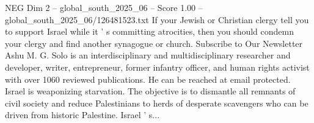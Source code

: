 \begin{textsample}{NEG Dim 2 – global\_south\_2025\_06 – Score 1.00 – global\_south\_2025\_06/126481523.txt}
If your Jewish or Christian clergy tell you to support Israel while it ' s committing atrocities, then you should condemn your clergy and find another synagogue or church.
Subscribe to Our Newsletter Ashu M.
G.
Solo is an interdisciplinary and multidisciplinary researcher and developer, writer, entrepreneur, former infantry officer, and human rights activist with over 1060 reviewed publications.
He can be reached at email protected.
Israel is weaponizing starvation.
The objective is to dismantle all remnants of civil society and reduce Palestinians to herds of desperate scavengers who can be driven from historic Palestine.
Israel ' s...

\end{textsample}
